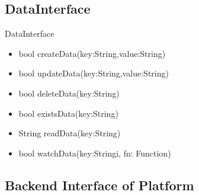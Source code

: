 \documentclass{beamer}
\newcommand{\drawLinkArrow}[4]{
		\pgfmathparse{2pt+3.5pt}
	\draw[->] let
		\p1 = (#1), \p2 = (#2),
		\p3 = (#3), \p4 = (#4)
		in
		({(\x1 + \x2)*1/2} ,\y1) -- ({(\x3 + \x4)*1/2} ,\y4);
}
\newcommand{\drawBox}[3]{
		\shade[top color=yellow,bottom color=black] (#1) rectangle (#2) node[midway,below] {#3};
}
\begin{document}
\subsection {DataInterface}
\begin{frame}
\begin{block}{DataInterface}
		\begin{itemize}
			\item bool \alert{createData}(key:String,value:String)
			\item bool \alert{updateData}(key:String,value:String)
			\item bool \alert{deleteData}(key:String)
			\item bool \alert{existsData}(key:String)
			\item String \alert{readData}(key:String)
			\item bool \alert{watchData}(key:Stringi, fn: Function)
		\end{itemize}
	\end{block}

\end{frame}


\subsection {Backend Interface of Platform}
\begin{frame}
\end{frame}
\end{document}
